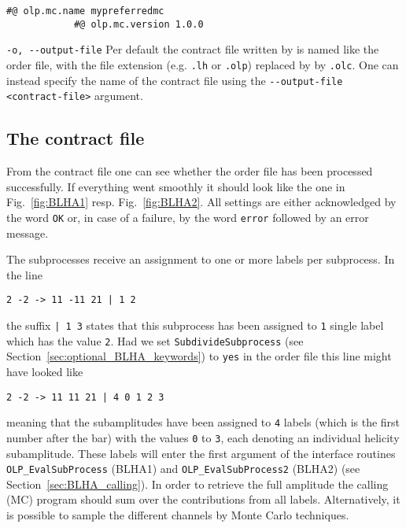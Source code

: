 \begin{basedescript}{\desclabelstyle{\pushlabel}}
      \begin{lstlisting}[style=in]
            #@ olp.mc.name mypreferredmc
            #@ olp.mc.version 1.0.0
      \end{lstlisting}
%
      \item[\hspace{-1em}]\colorbox{gray!30}{\lstinline[style=sh]|-o, --output-file|} Per default the contract file written by \gosam is named like the order file, with the file extension (e.g. \texttt{.lh} or \texttt{.olp}) replaced by by \texttt{.olc}. One can instead specify the name of the contract file using the \lstinline[style=sh]|--output-file <contract-file>| argument.
\end{basedescript}

\subsection{The contract file}
From the contract file one can see whether the order file has been processed successfully. If everything went smoothly it should look like the one in Fig.~\ref{fig:BLHA1} resp. Fig.~\ref{fig:BLHA2}. All settings are either acknowledged by the word \texttt{OK} or, in case of a failure, by the word \texttt{error} followed by an error message.

The subprocesses receive an assignment to one or more labels per subprocess. In the line
\begin{lstlisting}[style=in]
2 -2 -> 11 -11 21 | 1 2
\end{lstlisting}
the suffix \texttt{| 1 3} states that this subprocess has been assigned to \texttt{1} single label which has the value \texttt{2}. Had we set \texttt{SubdivideSubprocess} (see Section~\ref{sec:optional_BLHA_keywords}) to \texttt{yes} in the order file this line might have looked like
\begin{lstlisting}[style=in]
2 -2 -> 11 11 21 | 4 0 1 2 3
\end{lstlisting}
meaning that the subamplitudes have been assigned to \texttt{4} labels (which is the first number after the bar) with the values \texttt{0} to \texttt{3}, each denoting an individual helicity subamplitude. These labels will enter the first argument of the interface routines \texttt{OLP\_EvalSubProcess} (BLHA1) and \texttt{OLP\_EvalSubProcess2} (BLHA2) (see Section~\ref{sec:BLHA_calling}). In order to retrieve the full amplitude the calling (MC) program should sum over the contributions from all labels. Alternatively, it is possible to sample the different channels by Monte Carlo techniques.

